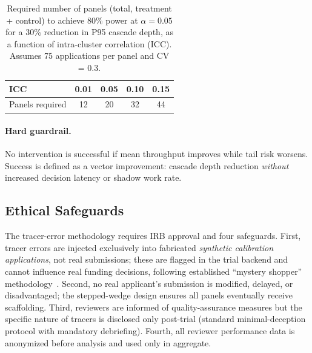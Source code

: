\documentclass[runningheads]{llncs}
\begin{document}
\begin{table}[t]
\centering
\caption{Required number of panels (total, treatment + control) to achieve 80\% power at $\alpha = 0.05$ for a 30\% reduction in P95 cascade depth, as a function of intra-cluster correlation (ICC). Assumes 75 applications per panel and CV = 0.3.}
\label{tab:icc}
\begin{tabular}{@{}lcccc@{}}
\toprule
ICC & 0.01 & 0.05 & 0.10 & 0.15 \\
\midrule
Panels required & 12 & 20 & 32 & 44 \\
\bottomrule
\end{tabular}
\end{table}

\paragraph{Hard guardrail.}
No intervention is successful if mean throughput improves while tail risk worsens. Success is defined as a vector improvement: cascade depth reduction \emph{without} increased decision latency or shadow work rate.

\subsection{Ethical Safeguards}
\label{sec:ethics}

The tracer-error methodology requires IRB approval and four safeguards. First, tracer errors are injected exclusively into fabricated \emph{synthetic calibration applications}, not real submissions; these are flagged in the trial backend and cannot influence real funding decisions, following established ``mystery shopper'' methodology~\cite{wendler2004deception}. Second, no real applicant's submission is modified, delayed, or disadvantaged; the stepped-wedge design ensures all panels eventually receive scaffolding. Third, reviewers are informed of quality-assurance measures but the specific nature of tracers is disclosed only post-trial (standard minimal-deception protocol with mandatory debriefing). Fourth, all reviewer performance data is anonymized before analysis and used only in aggregate.
\end{document}

